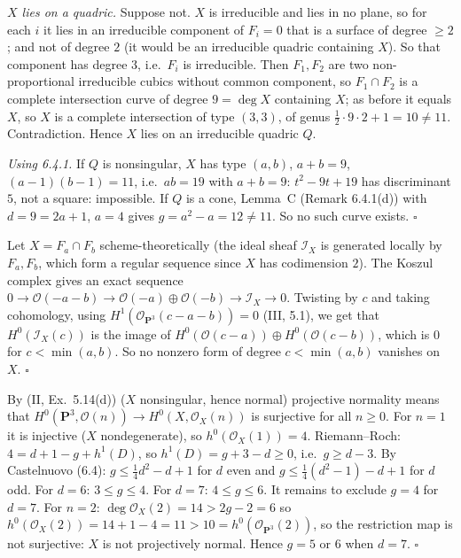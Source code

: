 \documentclass[11pt]{article}
\begin{document}
\emph{$X$ lies on a quadric.} Suppose not. $X$ is irreducible and lies in no plane, so for each $i$ it lies in an irreducible component of $F_i=0$ that is a surface of degree $\ge2$; and not of degree $2$ (it would be an irreducible quadric containing $X$). So that component has degree $3$, i.e.\ $F_i$ is irreducible. Then $F_1,F_2$ are two non-proportional irreducible cubics without common component, so $F_1\cap F_2$ is a complete intersection curve of degree $9=\deg X$ containing $X$; as before it equals $X$, so $X$ is a complete intersection of type $(3,3)$, of genus $\frac12\cdot9\cdot2+1=10\ne11$. Contradiction. Hence $X$ lies on an irreducible quadric $Q$.

\emph{Using 6.4.1.} If $Q$ is nonsingular, $X$ has type $(a,b)$, $a+b=9$, $(a-1)(b-1)=11$, i.e.\ $ab=19$ with $a+b=9$: $t^2-9t+19$ has discriminant $5$, not a square: impossible. If $Q$ is a cone, Lemma~C (Remark 6.4.1(d)) with $d=9=2a+1$, $a=4$ gives $g=a^2-a=12\ne11$. So no such curve exists. \hfill$\square$

\pf
Let $X=F_a\cap F_b$ scheme-theoretically (the ideal sheaf $\mathcal I_X$ is generated locally by $F_a,F_b$, which form a regular sequence since $X$ has codimension $2$). The Koszul complex gives an exact sequence $0\to\mathcal O(-a-b)\to\mathcal O(-a)\oplus\mathcal O(-b)\to\mathcal I_X\to0$. Twisting by $c$ and taking cohomology, using $H^1(\mathcal O_{\mathbf P^3}(c-a-b))=0$ (III, 5.1), we get that $H^0(\mathcal I_X(c))$ is the image of $H^0(\mathcal O(c-a))\oplus H^0(\mathcal O(c-b))$, which is $0$ for $c<\min(a,b)$. So no nonzero form of degree $c<\min(a,b)$ vanishes on $X$. \hfill$\square$

\pf
By (II, Ex.~5.14(d)) ($X$ nonsingular, hence normal) projective normality means that $H^0(\mathbf P^3,\mathcal O(n))\to H^0(X,\mathcal O_X(n))$ is surjective for all $n\ge0$. For $n=1$ it is injective ($X$ nondegenerate), so $h^0(\mathcal O_X(1))=4$. Riemann--Roch: $4=d+1-g+h^1(D)$, so $h^1(D)=g+3-d\ge0$, i.e.\ $g\ge d-3$. By Castelnuovo (6.4): $g\le\frac14d^2-d+1$ for $d$ even and $g\le\frac14(d^2-1)-d+1$ for $d$ odd. For $d=6$: $3\le g\le4$. For $d=7$: $4\le g\le6$. It remains to exclude $g=4$ for $d=7$. For $n=2$: $\deg\mathcal O_X(2)=14>2g-2=6$ so $h^0(\mathcal O_X(2))=14+1-4=11>10=h^0(\mathcal O_{\mathbf P^3}(2))$, so the restriction map is not surjective: $X$ is not projectively normal. Hence $g=5$ or $6$ when $d=7$. \hfill$\square$
\end{document}

